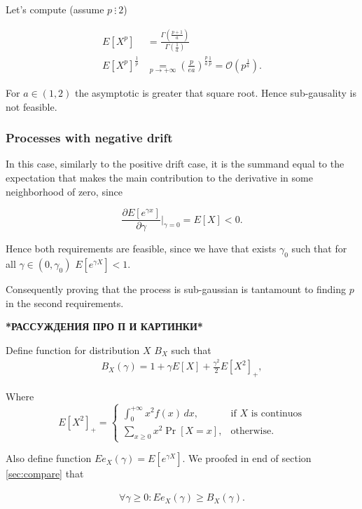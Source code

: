 \documentclass[12pt, a4paper]{article}
\theoremstyle{remark}
\newcommand{\underrel}[2]{\mathrel{\mathop{#2}\limits_{#1}}}
\begin{document}
Let's compute (assume $p\ \vdots\ 2$)

\begin{align*}
    E[X^p]             & = \frac{\Gamma\left(\frac{p + 1}{a}\right)}{\Gamma\left(\frac{1}{a}\right)}                                     \\
    E[X^p]^\frac{1}{p} & \underrel{p \to +\infty} {=} \left(\frac{p}{e a}\right)^{\frac{p}{a} \frac{1}{p}} = \mathcal{O}(p^\frac{1}{a}).
\end{align*}

For $a \in (1, 2)$ the asymptotic is greater that square root. Hence sub-gausality is not feasible.

\subsubsection{Processes with negative drift}

In this case, similarly to the positive drift case, it is the summand equal to the expectation that makes the main contribution to the derivative in some neighborhood of zero, since

$$\frac{\partial E[e^{\gamma x}]}{\partial \gamma} \Big|_{\gamma = 0} = E[X] < 0.$$

Hence both requirements are feasible, since we have that exists \(\gamma_0\) such that for all \(\gamma \in (0, \gamma_0)\) $E[e^{\gamma X}] < 1.$

Consequently proving that the process is sub-gaussian is tantamount to finding $p$ in the second requirements.

\hfill

\textbf{*РАССУЖДЕНИЯ ПРО П И КАРТИНКИ*}

\hfill

Define function for distribution $X$ $B_X$ such that
\begin{align*}
    B_X(\gamma) = 1 + \gamma E[X] + \frac{\gamma^2}{2} E[X^2]_+,
\end{align*}

Where
\[
E[X^2]_+= 
\begin{cases}
    \int_0^{+\infty} x^2 f(x)\, dx,& \text{if $X$ is continuos}\\
    \sum_{x \geq 0} x^2 \Pr[X = x],              & \text{otherwise}.
\end{cases}
\]

Also define function $Ee_X(\gamma) = E[e^{\gamma X}]$. We proofed in end of section \ref*{sec:compare} that

\begin{align*}
    \forall \gamma\geq 0: Ee_X(\gamma) \geq B_X(\gamma).
\end{align*}
\end{document}
